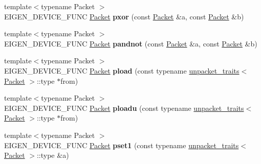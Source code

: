\begin{DoxyCompactItemize}
{\footnotesize template$<$typename Packet $>$ }\\E\+I\+G\+E\+N\+\_\+\+D\+E\+V\+I\+C\+E\+\_\+\+F\+U\+NC \hyperlink{union_eigen_1_1internal_1_1_packet}{Packet} {\bfseries pxor} (const \hyperlink{union_eigen_1_1internal_1_1_packet}{Packet} \&a, const \hyperlink{union_eigen_1_1internal_1_1_packet}{Packet} \&b)
\item 
\mbox{\label{namespace_eigen_1_1internal_af0d93efd1718510bd216388a89d1e5d4}} 
{\footnotesize template$<$typename Packet $>$ }\\E\+I\+G\+E\+N\+\_\+\+D\+E\+V\+I\+C\+E\+\_\+\+F\+U\+NC \hyperlink{union_eigen_1_1internal_1_1_packet}{Packet} {\bfseries pandnot} (const \hyperlink{union_eigen_1_1internal_1_1_packet}{Packet} \&a, const \hyperlink{union_eigen_1_1internal_1_1_packet}{Packet} \&b)
\item 
\mbox{\label{namespace_eigen_1_1internal_ae25c18feab0271a245176a7a3f2dcd3d}} 
{\footnotesize template$<$typename Packet $>$ }\\E\+I\+G\+E\+N\+\_\+\+D\+E\+V\+I\+C\+E\+\_\+\+F\+U\+NC \hyperlink{union_eigen_1_1internal_1_1_packet}{Packet} {\bfseries pload} (const typename \hyperlink{struct_eigen_1_1internal_1_1unpacket__traits}{unpacket\+\_\+traits}$<$ \hyperlink{union_eigen_1_1internal_1_1_packet}{Packet} $>$\+::type $\ast$from)
\item 
\mbox{\label{namespace_eigen_1_1internal_a5987b33df9fc7e5bd824287307fac913}} 
{\footnotesize template$<$typename Packet $>$ }\\E\+I\+G\+E\+N\+\_\+\+D\+E\+V\+I\+C\+E\+\_\+\+F\+U\+NC \hyperlink{union_eigen_1_1internal_1_1_packet}{Packet} {\bfseries ploadu} (const typename \hyperlink{struct_eigen_1_1internal_1_1unpacket__traits}{unpacket\+\_\+traits}$<$ \hyperlink{union_eigen_1_1internal_1_1_packet}{Packet} $>$\+::type $\ast$from)
\item 
\mbox{\label{namespace_eigen_1_1internal_afa6f9a9f3c905b28cc29841935e44fdb}} 
{\footnotesize template$<$typename Packet $>$ }\\E\+I\+G\+E\+N\+\_\+\+D\+E\+V\+I\+C\+E\+\_\+\+F\+U\+NC \hyperlink{union_eigen_1_1internal_1_1_packet}{Packet} {\bfseries pset1} (const typename \hyperlink{struct_eigen_1_1internal_1_1unpacket__traits}{unpacket\+\_\+traits}$<$ \hyperlink{union_eigen_1_1internal_1_1_packet}{Packet} $>$\+::type \&a)

\end{DoxyCompactItemize}
